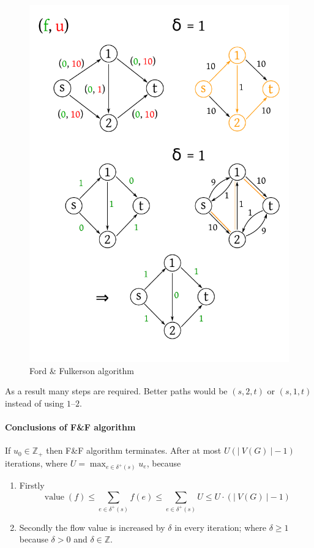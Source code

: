 \documentclass[a4paper]{article}
\theoremstyle{definition}
\newcommand{\card}[1]{\left|\:\!#1\:\!\right|}
\begin{document}
\begin{figure}[!ht]
 \begin{center}
  \includegraphics{img/ff_algo.pdf}
  \caption{Ford \& Fulkerson algorithm}
 \end{center}
\end{figure}

As a result many steps are required. Better paths would be $(s, 2, t)$ or $(s, 1, t)$ instead of using $1$--$2$.

\paragraph{Conclusions of F\&F algorithm}
If $u_0 \in \mathbb{Z}_+$ then F\&F algorithm terminates.
After at most $U(\card{V(G)} - 1)$ iterations, where $U = \max_{e \in \delta^+(s)} u_e$, because
\begin{enumerate}
  \item Firstly
    \[
      \operatorname{value}(f)
        \leq \sum_{e \in \delta^+(s)} f(e)
        \leq \sum_{e \in \delta^+(s)} U
        \leq U \cdot (\card{V(G)} - 1)
    \]
  \item Secondly the flow value is increased by $\delta$ in every iteration; where $\delta \geq 1$ because $\delta > 0$ and $\delta \in \mathbb{Z}$.
\end{enumerate}
\end{document}
